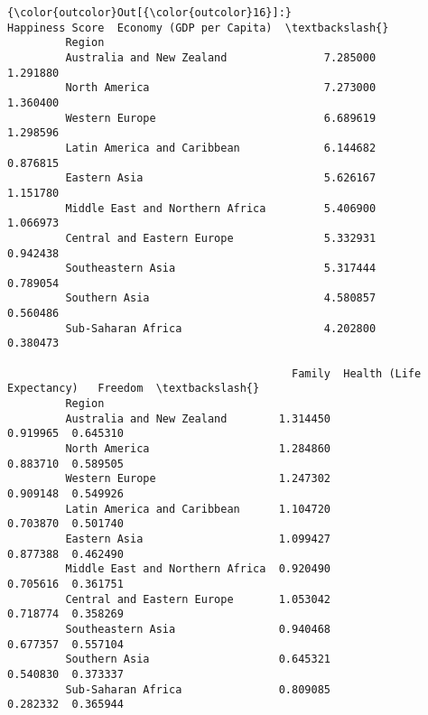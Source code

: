 \documentclass[11pt]{article}
\begin{document}
\begin{Verbatim}[commandchars=\\\{\}]
{\color{outcolor}Out[{\color{outcolor}16}]:}                                  Happiness Score  Economy (GDP per Capita)  \textbackslash{}
         Region                                                                       
         Australia and New Zealand               7.285000                  1.291880   
         North America                           7.273000                  1.360400   
         Western Europe                          6.689619                  1.298596   
         Latin America and Caribbean             6.144682                  0.876815   
         Eastern Asia                            5.626167                  1.151780   
         Middle East and Northern Africa         5.406900                  1.066973   
         Central and Eastern Europe              5.332931                  0.942438   
         Southeastern Asia                       5.317444                  0.789054   
         Southern Asia                           4.580857                  0.560486   
         Sub-Saharan Africa                      4.202800                  0.380473   
         
                                            Family  Health (Life Expectancy)   Freedom  \textbackslash{}
         Region                                                                          
         Australia and New Zealand        1.314450                  0.919965  0.645310   
         North America                    1.284860                  0.883710  0.589505   
         Western Europe                   1.247302                  0.909148  0.549926   
         Latin America and Caribbean      1.104720                  0.703870  0.501740   
         Eastern Asia                     1.099427                  0.877388  0.462490   
         Middle East and Northern Africa  0.920490                  0.705616  0.361751   
         Central and Eastern Europe       1.053042                  0.718774  0.358269   
         Southeastern Asia                0.940468                  0.677357  0.557104   
         Southern Asia                    0.645321                  0.540830  0.373337   
         Sub-Saharan Africa               0.809085                  0.282332  0.365944   
         

\end{Verbatim}
\end{document}
